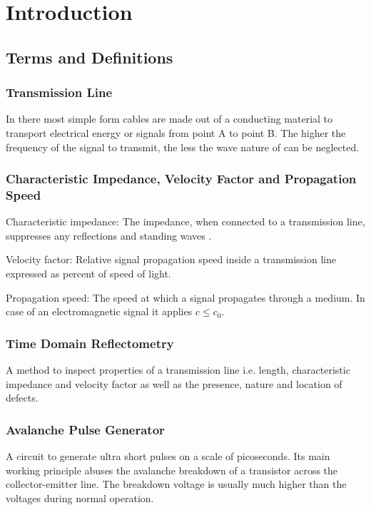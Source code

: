 \chapter{Introduction}
%
\section{Terms and Definitions}
    \subsection*{Transmission Line}\label{sec:transmissionLine}
        In there most simple form cables are made out of a conducting material to transport electrical energy or signals from point
        A to point B. The higher the frequency of the signal to transmit, the less the wave nature of can be neglected.
    \subsection*{Characteristic Impedance, Velocity Factor and Propagation Speed}
        Characteristic impedance: The impedance, when connected to a transmission line, suppresses any reflections and standing
        waves \cite{ATIS.AmericanTelecomStandards2001}.\par
        Velocity factor: Relative signal propagation speed inside a transmission line expressed as percent of speed of light.\par
        Propagation speed: The speed at which a signal propagates through a medium. In case of an electromagnetic signal
        it applies \( c \leq c_0 \).
    \subsection*{Time Domain Reflectometry}
        A method to inspect properties of a transmission line i.e. length, characteristic impedance and velocity factor as
        well as the presence, nature and location of defects.
    \subsection*{Avalanche Pulse Generator}
        A circuit to generate ultra short pulses on a scale of picoseconds. Its main working principle abuses the avalanche
        breakdown of a transistor across the collector-emitter line. The breakdown voltage is usually much higher than the
        voltages during normal operation.
